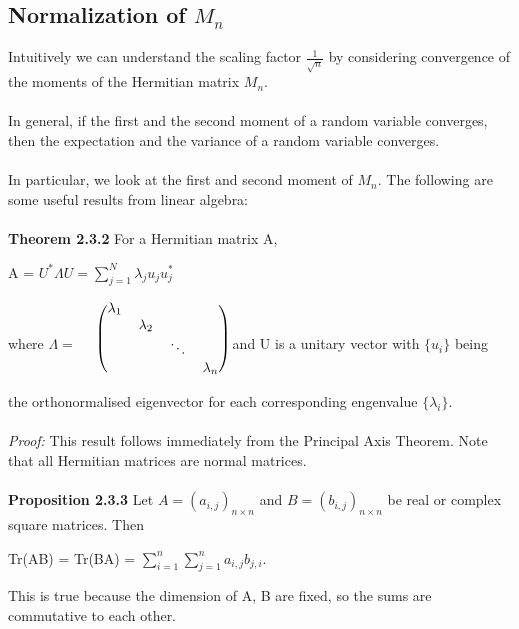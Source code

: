 \documentclass{article}
\begin{document}
\subsection{Normalization of $M_n$}
Intuitively we can understand the scaling factor $\frac{1}{\sqrt{n}}$ by considering convergence of the moments of the Hermitian matrix $M_n$. \\ \\
In general, if the first and the second moment of a random variable converges, then the expectation and the variance of a random variable converges. \\ \\
In particular, we look at the first and second moment of $M_n$. The following are some useful results from linear algebra:\\
\\
\textbf{Theorem 2.3.2} For a Hermitian matrix A, 
\begin{center}
    A = $U^* \Lambda U = \sum\limits_{j = 1}^N \lambda_j u_j u_j^*$
\end{center}
where $\Lambda = $
$\begin{blockarray}{lcccc}
\begin{block}{l(cccc)}
 & \lambda_1 &          &        & \\
 &           &\lambda_2 &        & \\
 &           &          & \ddots &  \\
 &           &          &        &\lambda_n\\
\end{block}
\end{blockarray}$
and U is a unitary vector with $\{ u_i \}$ being the orthonormalised eigenvector for each corresponding engenvalue $\{ \lambda _i\}$.
\\
\\
\noindent\textit{Proof:} This result follows immediately from the Principal Axis Theorem. Note that all Hermitian matrices are normal matrices. \\
\\
\textbf{Proposition 2.3.3} Let $A = (a_{i,j})_{n \times n}$ and $B = (b_{i,j})_{n \times n}$ be real or complex square matrices. Then
\begin{center}
    Tr(AB) = Tr(BA) = $\sum\limits_{i = 1}^n \sum\limits_{j = 1}^n a_{i,j}b_{j,i}$.
\end{center}
This is true because the dimension of A, B are fixed, so the sums are commutative to each other.
\\ \\
\end{document}
